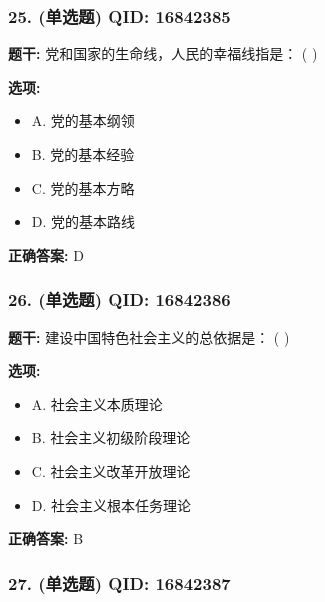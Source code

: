 \documentclass[12pt,UTF8]{ctexart}
\begin{document}
\subsubsection*{25. (单选题) \small QID: 16842385}

\textbf{题干:}
党和国家的生命线，人民的幸福线指是： ( )

\textbf{选项:}
\begin{itemize}[leftmargin=*]

  \item A. 党的基本纲领

  \item B. 党的基本经验

  \item C. 党的基本方略

  \item D. 党的基本路线

\end{itemize}

\textbf{正确答案:}
D

\vspace{0.3em}\hrulefill\vspace{0.7em}

\subsubsection*{26. (单选题) \small QID: 16842386}

\textbf{题干:}
建设中国特色社会主义的总依据是： ( )

\textbf{选项:}
\begin{itemize}[leftmargin=*]

  \item A. 社会主义本质理论

  \item B. 社会主义初级阶段理论

  \item C. 社会主义改革开放理论

  \item D. 社会主义根本任务理论

\end{itemize}

\textbf{正确答案:}
B

\vspace{0.3em}\hrulefill\vspace{0.7em}

\subsubsection*{27. (单选题) \small QID: 16842387}
\end{document}
